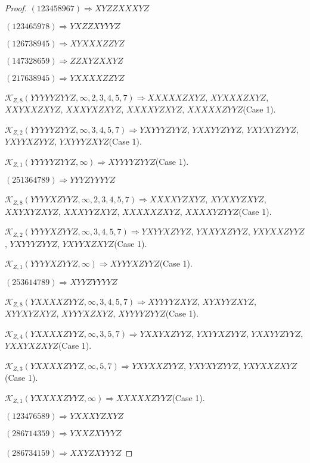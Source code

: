 \documentclass[12pt]{article}
\theoremstyle{plain}
\theoremstyle{definition}
\theoremstyle{remark}
\newcommand{\fancy}[1]{\mathcal{#1}}
\def\K{\fancy{K}}
\begin{document}
\begin{proof}
	$(1 2 3 4 5 8 9 6 7)\Rightarrow XYZZXXXYZ$
	
	$(1 2 3 4 6 5 9 7 8)\Rightarrow YXZZXYYYZ$
	
	$(1 2 6 7 3 8 9 4 5)\Rightarrow XYXXXZZYZ$
	
	$(1 4 7 3 2 8 6 5 9)\Rightarrow ZZXYZXXYZ$
	
	$(2 1 7 6 3 8 9 4 5)\Rightarrow YXXXXZZYZ$
	
	
	
	$\K_{Z,8}(YYYYYZYYZ,\infty,2, 3, 4, 5, 7)\Rightarrow $$XXXXXZXYZ$, $XYXXXZXYZ$, $XXYXXZXYZ$, $XXXYXZXYZ$, $XXXXYZXYZ$, $XXXXXZYYZ$(Case 1).
	
	$\K_{Z,2}(YYYYYZYYZ,\infty,3, 4, 5, 7)\Rightarrow $$YXYYYZYYZ$, $YXXYYZYYZ$, $YXYXYZYYZ$, $YXYYXZYYZ$, $YXYYYZXYZ$(Case 1).
	
	$\K_{Z,1}(YYYYYZYYZ,\infty)\Rightarrow $$XYYYYZYYZ$(Case 1).
	
	
	
	$(2 5 1 3 6 4 7 8 9)\Rightarrow YYYZYYYYZ$
	
	
	
	$\K_{Z,8}(YYYYXZYYZ,\infty,2, 3, 4, 5, 7)\Rightarrow $$XXXXYZXYZ$, $XYXXYZXYZ$, $XXYXYZXYZ$, $XXXYYZXYZ$, $XXXXXZXYZ$, $XXXXYZYYZ$(Case 1).
	
	$\K_{Z,2}(YYYYXZYYZ,\infty,3, 4, 5, 7)\Rightarrow $$YXYYXZYYZ$, $YXXYXZYYZ$, $YXYXXZYYZ$, $YXYYYZYYZ$, $YXYYXZXYZ$(Case 1).
	
	$\K_{Z,1}(YYYYXZYYZ,\infty)\Rightarrow $$XYYYXZYYZ$(Case 1).
	
	
	
	$(2 5 3 6 1 4 7 8 9)\Rightarrow XYYZYYYYZ$
	
	
	
	$\K_{Z,8}(YXXXXZYYZ,\infty,3, 4, 5, 7)\Rightarrow $$XYYYYZXYZ$, $XYXYYZXYZ$, $XYYXYZXYZ$, $XYYYXZXYZ$, $XYYYYZYYZ$(Case 1).
	
	$\K_{Z,4}(YXXXXZYYZ,\infty,3, 5, 7)\Rightarrow $$YXXYXZYYZ$, $YXYYXZYYZ$, $YXXYYZYYZ$, $YXXYXZXYZ$(Case 1).
	
	$\K_{Z,3}(YXXXXZYYZ,\infty,5, 7)\Rightarrow $$YXYXXZYYZ$, $YXYXYZYYZ$, $YXYXXZXYZ$(Case 1).
	
	$\K_{Z,1}(YXXXXZYYZ,\infty)\Rightarrow $$XXXXXZYYZ$(Case 1).
	
	
	
	$(1 2 3 4 7 6 5 8 9)\Rightarrow YXXXYZXYZ$
	
	$(2 8 6 7 1 4 3 5 9)\Rightarrow YXXZXYYYZ$
	
	$(2 8 6 7 3 4 1 5 9)\Rightarrow XXYZXYYYZ$
	
	
	

\end{proof}
\end{document}
